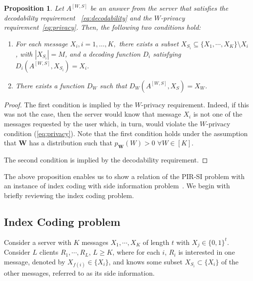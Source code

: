 \documentclass[letterpaper, 10 pt, conference]{ieeeconf}
\newtheorem{proposition}{Proposition}
\newcommand{\Xj}[1]{X_{#1}} %
\newcommand{\A}[2]{A^{[#1,#2]}} %
\begin{document}
\begin{proposition}
\label{prop:necessity}
Let $\A{W}{S}$ be an answer from the server that  satisfies the decodability requirement ~\eqref{eq:decodability} and the $W$-privacy requirement~\eqref{eq:privacy}. Then, the following two conditions hold:
\begin{enumerate}
\item For each message $X_i, i=1,\dots, K,$ there exists a subset  $\Xj{S_i}\subseteq\{\Xj{1},\cdots,\Xj{K}\} \setminus \Xj{i}$, with $|\Xj{S_i}| = M $, and a decoding function $D_{i}$ satisfying $D_i\left(\A{W}{S},\Xj{S_i}\right) = X_i$.
\item There exists a function $D_W$ such that $D_W\left(\A{W}{S},\Xj{S}\right) = X_W$. 
\end{enumerate}
\end{proposition}
\begin{proof}
The first condition is implied by the $W$-privacy requirement. Indeed, if this was not the case, then the server would know that message $X_i$ is not one of the messages requested by the user which, in turn, would violate the $W$-privacy condition (\ref{eq:privacy}). Note that the first condition holds under the assumption that $\mathbf{W}$ has a distribution such that $p_{\mathbf{W}}(W) > 0$ $\forall W\in[K]$.  

The second condition is implied by the decodability requirement.
\end{proof}

The above proposition enables us to show a relation of the PIR-SI problem with an instance of index coding with side information problem~\cite{BarYossef:IT:11,effros2015equivalence,el2010index}. We begin with briefly reviewing the index coding problem.   

\subsection{Index Coding problem}


Consider a server with $K$ messages $\Xj{1},\cdots, \Xj{K}$ of length $t$ with $\Xj{j}\in\{0,1\}^t$. Consider $L$ clients $R_1, \cdots, R_L$, $L\geq K$, where for each $i$, $R_i$ is interested in one message, denoted by $\Xj{f(i)}\in \{\Xj{i}\}$, and knows some subset $\Xj{S_i} \subset \{\Xj{i}\}$ of the other messages, referred to as its side information. %
\end{document}
